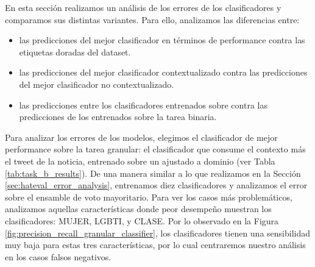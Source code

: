 En esta sección realizamos un análisis de los errores de los clasificadores y comparamos sus distintas variantes. Para ello, analizamos las diferencias entre:

\begin{itemize}
    \item las predicciones del mejor clasificador en términos de performance contra las etiquetas doradas del dataset.
    \item las predicciones del mejor clasificador contextualizado contra las predicciones del mejor clasificador no contextualizado.
    \item las predicciones entre los clasificadores entrenados sobre contra las predicciones de los entrenados sobre la tarea binaria.
\end{itemize}

Para analizar los errores de los modelos, elegimos el clasificador de mejor performance sobre la tarea granular: el clasificador que consume el contexto más el tweet de la noticia, entrenado sobre un \beto{} ajustado a dominio (ver Tabla \ref{tab:task_b_results}). De una manera similar a lo que realizamos en la Sección \ref{sec:hateval_error_analysis}, entrenamos diez clasificadores y analizamos el error sobre el ensamble de voto mayoritario. Para ver los casos más problemáticos, analizamos aquellas características donde peor desempeño muestran los clasificadores: MUJER, LGBTI, y CLASE. Por lo observado en la Figura \ref{fig:precision_recall_granular_classifier}, los clasificadores tienen una sensibilidad muy baja para estas tres características, por lo cual centraremos nuestro análisis en los casos falsos negativos.


